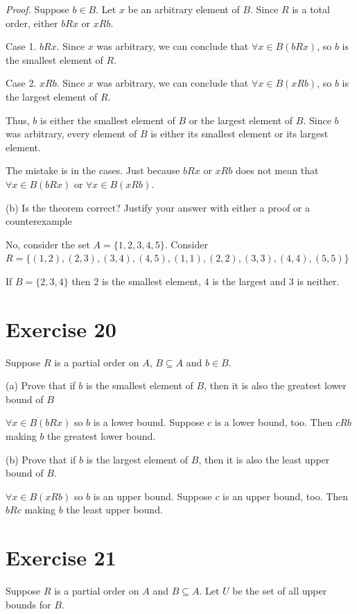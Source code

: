 \documentclass[11pt]{article}
\begin{document}
\textit{Proof.} Suppose $b \in B$. Let $x$ be an arbitrary element of $B$. 
Since $R$ is a total order, either $bRx$ or $xRb$.

Case 1. $bRx$. Since $x$ was arbitrary, we can conclude that $\forall x \in B(bRx)$,
so $b$ is the smallest element of $R$.

Case 2. $xRb$. Since $x$ was arbitrary, we can conclude that $\forall x \in B (xRb)$,
so $b$ is the largest element of $R$. 

Thus, $b$ is either the smallest element of $B$ or the largest element of $B$.
Since $b$ was arbitrary, every element of $B$ is either its smallest element 
or its largest element.

The mistake is in the cases. Just because $bRx$ or $xRb$ does not mean that 
$\forall x \in B (bRx)$ or $\forall x \in B (xRb)$.

\noindent (b) Is the theorem correct? Justify your answer with either a proof 
or a counterexample

No, consider the set $A = \{1,2,3,4,5\}$. Consider $R=\{(1,2),(2,3),(3,4),(4,5),(1,1),(2,2),(3,3),(4,4),(5,5)\}$

If $B=\{2,3,4\}$ then 2 is the smallest element, 4 is the largest and 3 is
neither.

\section*{Exercise 20}

Suppose $R$ is a partial order on $A$, $B \subseteq A$ and $b \in B$.

\noindent (a) Prove that if $b$ is the smallest element of $B$, then it is also 
the greatest lower bound of $B$

$\forall x \in B (b R x)$ so $b$ is a lower bound. Suppose $c$ is a lower bound, 
too. Then $cRb$ making $b$ the greatest lower bound.

\noindent (b) Prove that if $b$ is the largest element of $B$, then it is also 
the least upper bound of $B$.

$\forall x \in B (xRb)$ so $b$ is an upper bound. Suppose $c$ is an upper bound,
too. Then $bRc$ making $b$ the least upper bound. 

\section*{Exercise 21}

Suppose $R$ is a partial order on $A$ and $B \subseteq A$. Let $U$ be the set of
all upper bounds for $B$.
\end{document}
